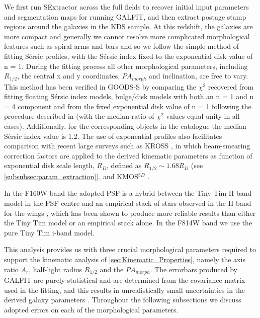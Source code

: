 \documentclass[fleqn,usenatbib]{mn2e}
\newcommand{\Sers}{S\'{e}rsic }
\begin{document}
We first run SExtractor \citep{Bertin1996} across the full fields to recover initial input parameters and segmentation maps for running GALFIT, and then extract postage stamp regions around the galaxies in the KDS sample.
At this redshift, the galaxies are more compact and generally we cannot resolve more complicated morphological features such as spiral arms and bars and so we follow the simple method of fitting \Sers profiles, with the \Sers index fixed to the exponential disk value of n = 1.
During the fitting process all other morphological parameters, including $R_{1/2}$, the central x and y coordinates, $PA_{morph}$ and inclination, are free to vary.
This method has been verified in GOODS-S by comparing the $\chi ^{2}$ recovered from fitting floating \Sers index models, bulge/disk models with both an n = 1 and n = 4 component and from the fixed exponential disk value of n = 1 following the procedure described in \cite{Bruce2012} (with the median ratio of $\chi ^{2}$ values equal unity in all cases). Additionally, for the corresponding objects in the \cite{VanderWel2012} catalogue the median \Sers index value is 1.2.
The use of exponential profiles also facilitates comparison with recent large surveys such as KROSS \citep{Harrison2017}, in which beam-smearing correction factors are applied to the derived kinematic parameters as function of exponential disk scale length, $R_{D}$, defined as $R_{1/2} \sim 1.68 R_{D}$ (see \cref{subsubsec:param_extraction}), and KMOS$^{3D}$ \citep{Wisnioski2015}.

In the F160W band the adopted PSF is a hybrid between the Tiny Tim H-band model \citep{Krist2011} in the PSF centre and an empirical stack of stars observed in the H-band for the wings \citep{VanderWel2012}, which has been shown to produce more reliable results than either the Tiny Tim model or an empirical stack alone.
In the F814W band we use the pure Tiny Tim i-band model.

This analysis provides us with three crucial morphological parameters required to support the kinematic analysis of \cref{sec:Kinematic_Properties}, namely the axis ratio $A_{r}$, half-light radius $R_{1/2}$ and the $PA_{morph}$. The errorbars produced by GALFIT are purely statistical and are determined from the covariance matrix used in the fitting, and this results in unrealistically small uncertainties in the derived galaxy parameters \citep{Hausler2007,Bruce2012}.
Throughout the following subsections we discuss adopted errors on each of the morphological parameters.
\end{document}
